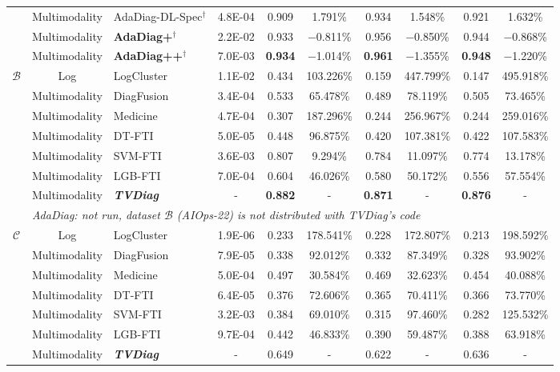 \begin{table}[!ht]
\begin{tabular}{c c l c c c c c c c}
 & Multimodality & AdaDiag-DL-Spec$^\dagger$ & 4.8E-04 & 0.909 & 1.791\% & 0.934 & 1.548\% & 0.921 & 1.632\% \\
 & Multimodality & \textbf{AdaDiag+}$^\dagger$ & 2.2E-02 & 0.933 & $-$0.811\% & 0.956 & $-$0.850\% & 0.944 & $-$0.868\% \\
 & Multimodality & \textbf{AdaDiag++}$^\dagger$ & 7.0E-03 & \textbf{0.934} & $-$1.014\% & \textbf{0.961} & $-$1.355\% & \textbf{0.948} & $-$1.220\% \\
\midrule
\multirow{8}{*}{$\mathcal{B}$} & Log & LogCluster & 1.1E-02 & 0.434 & 103.226\% & 0.159 & 447.799\% & 0.147 & 495.918\% \\
 & Multimodality & DiagFusion & 3.4E-04 & 0.533 & 65.478\% & 0.489 & 78.119\% & 0.505 & 73.465\% \\
 & Multimodality & Medicine & 4.7E-04 & 0.307 & 187.296\% & 0.244 & 256.967\% & 0.244 & 259.016\% \\
 & Multimodality & DT-FTI & 5.0E-05 & 0.448 & 96.875\% & 0.420 & 107.381\% & 0.422 & 107.583\% \\
 & Multimodality & SVM-FTI & 3.6E-03 & 0.807 & 9.294\% & 0.784 & 11.097\% & 0.774 & 13.178\% \\
 & Multimodality & LGB-FTI & 7.0E-04 & 0.604 & 46.026\% & 0.580 & 50.172\% & 0.556 & 57.554\% \\
 & Multimodality & \textbf{\textit{TVDiag}} & - & \textbf{0.882} & - & \textbf{0.871} & - & \textbf{0.876} & - \\
 & \multicolumn{9}{l}{\footnotesize\itshape AdaDiag: not run, dataset $\mathcal{B}$ (AIOps-22) is not distributed with TVDiag's code} \\
\midrule
\multirow{17}{*}{$\mathcal{C}$} & Log & LogCluster & 1.9E-06 & 0.233 & 178.541\% & 0.228 & 172.807\% & 0.213 & 198.592\% \\
 & Multimodality & DiagFusion & 7.9E-05 & 0.338 & 92.012\% & 0.332 & 87.349\% & 0.328 & 93.902\% \\
 & Multimodality & Medicine & 5.0E-04 & 0.497 & 30.584\% & 0.469 & 32.623\% & 0.454 & 40.088\% \\
 & Multimodality & DT-FTI & 6.4E-05 & 0.376 & 72.606\% & 0.365 & 70.411\% & 0.366 & 73.770\% \\
 & Multimodality & SVM-FTI & 3.2E-03 & 0.384 & 69.010\% & 0.315 & 97.460\% & 0.282 & 125.532\% \\
 & Multimodality & LGB-FTI & 9.7E-04 & 0.442 & 46.833\% & 0.390 & 59.487\% & 0.388 & 63.918\% \\
 & Multimodality & \textbf{\textit{TVDiag}} & - & 0.649 & - & 0.622 & - & 0.636 & - \\

\end{tabular}
\end{table}
